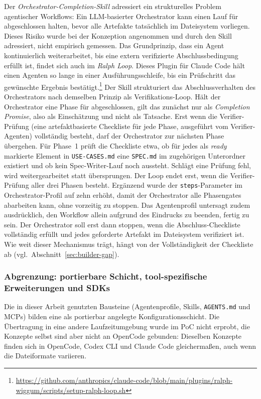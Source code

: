 Der \emph{Orchestrator-Completion-Skill} adressiert ein strukturelles Problem agentischer Workflows: Ein LLM-basierter Orchestrator kann einen Lauf für abgeschlossen halten, bevor alle Artefakte tatsächlich im Dateisystem vorliegen. Dieses Risiko wurde bei der Konzeption angenommen und durch den Skill adressiert, nicht empirisch gemessen. Das Grundprinzip, dass ein Agent kontinuierlich weiterarbeitet, bis eine extern verifizierte Abschlussbedingung erfüllt ist, findet sich auch im \emph{Ralph Loop}. Dieses Plugin für Claude Code hält einen Agenten so lange in einer Ausführungsschleife, bis ein Prüfschritt das gewünschte Ergebnis bestätigt.\footnote{\url{https://github.com/anthropics/claude-code/blob/main/plugins/ralph-wiggum/scripts/setup-ralph-loop.sh}} Der Skill strukturiert das Abschlussverhalten des Orchestrators nach demselben Prinzip als Verifikations-Loop. Hält der Orchestrator eine Phase für abgeschlossen, gilt das zunächst nur als \emph{Completion Promise}, also als Einschätzung und nicht als Tatsache. Erst wenn die Verifier-Prüfung (eine artefaktbasierte Checkliste für jede Phase, ausgeführt vom Verifier-Agenten) vollständig besteht, darf der Orchestrator zur nächsten Phase übergehen. Für Phase~1 prüft die Checkliste etwa, ob für jedes als \emph{ready} markierte Element in \texttt{USE-CASES.md} eine \texttt{SPEC.md} im zugehörigen Unterordner existiert und ob kein Spec-Writer-Lauf noch aussteht. Schlägt eine Prüfung fehl, wird weitergearbeitet statt übersprungen. Der Loop endet erst, wenn die Verifier-Prüfung aller drei Phasen besteht. Ergänzend wurde der \texttt{steps}-Parameter im Orchestrator-Profil auf zehn erhöht, damit der Orchestrator alle Phasengates abarbeiten kann, ohne vorzeitig zu stoppen. Das Agentenprofil untersagt zudem ausdrücklich, den Workflow allein aufgrund des Eindrucks zu beenden, fertig zu sein. Der Orchestrator soll erst dann stoppen, wenn die Abschluss-Checkliste vollständig erfüllt und jedes geforderte Artefakt im Dateisystem verifiziert ist. Wie weit dieser Mechanismus trägt, hängt von der Vollständigkeit der Checkliste ab (vgl.\ Abschnitt~\ref{sec:builder-gap}).

\subsubsection{Abgrenzung: portierbare Schicht, tool-spezifische Erweiterungen und SDKs}

Die in dieser Arbeit genutzten Bausteine (Agentenprofile, Skills, \texttt{AGENTS.md} und MCPs) bilden eine als portierbar angelegte Konfigurationsschicht. Die Übertragung in eine andere Laufzeitumgebung wurde im PoC nicht erprobt, die Konzepte selbst sind aber nicht an OpenCode gebunden: Dieselben Konzepte finden sich in OpenCode, Codex CLI und Claude Code gleichermaßen, auch wenn die Dateiformate variieren.

